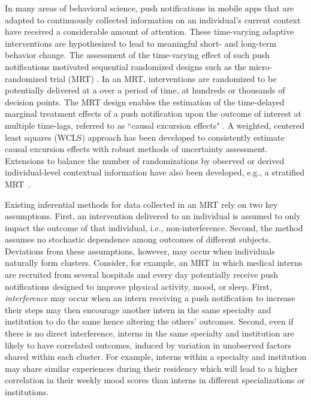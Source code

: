 \documentclass[12pt]{article}
\begin{document}
In many areas of behavioral science, push notifications in mobile apps that are adapted to continuously collected information on an individual's current context have received a considerable amount of attention.  These time-varying adaptive interventions are hypothesized to lead to meaningful short- and long-term behavior change. The assessment of the time-varying effect of such push notifications motivated sequential randomized designs such as the micro-randomized trial (MRT) \citep{Nahum2017, KlasnjaMRT}. In an MRT, interventions are randomized to be potentially delivered at a over a period of time, at hundreds or thousands of decision points. The MRT design enables the estimation of the time-delayed marginal treatment effects of a push notification upon the outcome of interest at multiple time-lags, referred to as ``causal excursion effects" \citep{Boruvkaetal, Qian2021}. A weighted, centered least squares (WCLS) approach has been developed to consistently estimate causal excursion effects with robust methods of uncertainty assessment. Extensions to balance the number of randomizations by observed or derived individual-level contextual information have also been developed, e.g., a stratified MRT~\citep{DempseyAOAS}.

Existing inferential methods for data collected in an MRT rely on two key assumptions. First, an intervention delivered to an individual is assumed to only impact the outcome of that individual, i.e., non-interference. Second, the method assumes no stochastic dependence among outcomes of different subjects. Deviations from these assumptions, however, may occur when individuals naturally form clusters.  Consider, for example, an MRT in which medical interns are recruited from several hospitals and every day potentially receive push notifications designed to improve physical activity, mood, or sleep. First, \textit{interference} may occur when an intern receiving a push notification to increase their steps may then encourage another intern in the same specialty and institution to do the same hence altering the others' outcomes. Second, even if there is no direct interference, interns in the same specialty and institution are likely to have correlated outcomes, induced by variation in unobserved factors shared within each cluster. For example, interns within a specialty and institution may share similar experiences during their residency which will lead to a higher correlation in their weekly mood scores than interns in different specializations or institutions.
\end{document}
